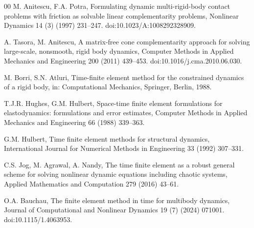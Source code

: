 \documentclass[preprint,12pt]{elsarticle}
\begin{document}
\begin{thebibliography}{00}
M. Anitescu, F.A. Potra,
Formulating dynamic multi-rigid-body contact problems with friction as solvable linear
complementarity problems,
Nonlinear Dynamics 14 (3) (1997) 231--247.
doi:10.1023/A:1008292328909.

A. Tasora, M. Anitescu,
A matrix-free cone complementarity approach for solving large-scale, nonsmooth, rigid body
dynamics,
Computer Methods in Applied Mechanics and Engineering 200 (2011) 439--453.
doi:10.1016/j.cma.2010.06.030.

M. Borri, S.N. Atluri,
Time-finite element method for the constrained dynamics of a rigid body,
in: Computational Mechanics, Springer, Berlin, 1988.

T.J.R. Hughes, G.M. Hulbert,
Space-time finite element formulations for elastodynamics: formulations and error estimates,
Computer Methods in Applied Mechanics and Engineering 66 (1988) 339--363.

G.M. Hulbert,
Time finite element methods for structural dynamics,
International Journal for Numerical Methods in Engineering 33 (1992) 307--331.

C.S. Jog, M. Agrawal, A. Nandy,
The time finite element as a robust general scheme for solving nonlinear dynamic equations
including chaotic systems,
Applied Mathematics and Computation 279 (2016) 43--61.

O.A. Bauchau,
The finite element method in time for multibody dynamics,
Journal of Computational and Nonlinear Dynamics 19 (7) (2024) 071001.
doi:10.1115/1.4063953.

\end{thebibliography}
\end{document}
